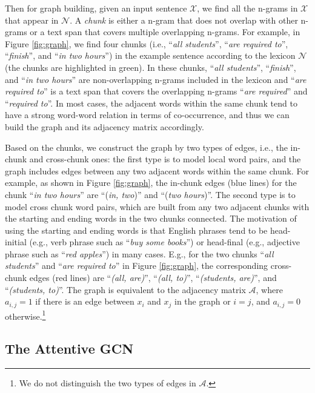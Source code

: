 \documentclass[11pt,a4paper]{article}
\begin{document}
Then for graph building, given an input sentence $\mathcal{X}$, we find all the n-grams in $\mathcal{X}$ that 
appear in $\mathcal{N}$. A {\it chunk} is either a n-gram that does not overlap with other n-grams or a text span that covers multiple overlapping n-grams.
For example, in Figure \ref{fig:graph}, we find four chunks (i.e., ``\textit{all students}'', ``\textit{are required to}'', ``\textit{finish}'', and ``\textit{in two hours}'') in the example sentence according to the lexicon $\mathcal{N}$ (the chunks are highlighted in green).
In these chunks, ``\textit{all students}'', ``\textit{finish}'', and ``\textit{in two hours}'' are non-overlapping n-grams included in the lexicon and ``\textit{are required to}'' is a text span that covers the overlapping n-grams ``\textit{are required}'' and ``\textit{required to}''.
In most cases, the adjacent words within the same chunk tend to have a strong word-word relation in terms of co-occurrence, and thus we can build the graph and its adjacency matrix accordingly.


Based on the chunks, we construct the graph by two types of edges, i.e., the in-chunk and cross-chunk ones:
the first type is to model local word pairs, and the graph includes edges
between any two adjacent words within the same chunk.
For example, as shown in Figure \ref{fig:graph}, the in-chunk edges (blue lines) for the chunk ``\textit{in two hours}'' are ``(\textit{in, two})''
and ``(\textit{two hours})''.
The second type is to model cross chunk word pairs, which are built from any two adjacent chunks with
the starting and ending words in the two chunks connected.
The motivation of using the starting and ending words is that English phrases tend to be head-initial (e.g., verb phrase such as ``\textit{buy some books}'') or head-final (e.g., adjective phrase such as ``\textit{red apples}'') in many cases. E.g.,
for the two chunks ``\textit{all students}'' and ``\textit{are required to}'' in Figure \ref{fig:graph}, the corresponding cross-chunk edges (red lines) are ``\textit{(all, are)}'', ``\textit{(all, to)}'', ``\textit{(students, are)}'', and ``\textit{(students, to)}''.
The graph is equivalent to the adjacency matrix $\mathcal{A}$, where $a_{i,j}=1$ if there is an edge between $x_i$ and $x_j$ in the graph or $i=j$, and $a_{i,j}=0$ otherwise.\footnote{We do not distinguish the two types of edges in $\mathcal{A}$.}







\subsection{The Attentive GCN}
\end{document}
